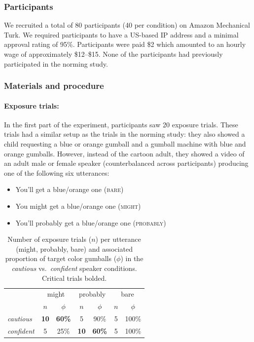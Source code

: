 \documentclass[lucida,biblatex]{sp} %
\begin{document}
\subsubsection{Participants}
We recruited a total of 80 participants (40 per condition) on Amazon Mechanical Turk. 
We required participants to have a US-based IP address and a minimal approval rating 
of 95\%. Participants were paid \$2 which amounted to an hourly wage of approximately 
\$12--\$15. None of the participants had previously participated in the norming study.

\subsubsection{Materials and procedure}

\paragraph{Exposure trials:} In the first part of the experiment, participants saw 20 exposure trials. 
These trials had a similar setup as the trials in the norming study: 
they also showed a child requesting a blue or orange gumball and a gumball machine with blue and orange gumballs. 
However, instead of the cartoon adult, they showed a video of an adult male or female speaker (counterbalanced across participants) producing one of the following six utterances:

\begin{itemize}
\item You'll get a blue/orange one (\textsc{bare})
\item You might get a blue/orange one (\textsc{might})
\item You'll probably get a blue/orange one (\textsc{probably})
\end{itemize}

\begin{table}
\centering
\begin{tabular}{l c c c c c c}
\toprule
& \multicolumn{2}{c}{\sc might} & \multicolumn{2}{c}{\sc probably} & \multicolumn{2}{c}{\sc bare}\\
& $n$ & $\phi$ & $n$ & $\phi$ & $n$ & $\phi$\\
\midrule
\emph{cautious} & {\bf 10} & {\bf 60\%} & 5 & 90\% & 5 & 100\%\\
\emph{confident} & 5 & 25\% & {\bf 10}  & {\bf 60\%} & 5  & 100\%\\  
\bottomrule
\end{tabular}
\caption{Number of exposure trials ($n$) per utterance ({\sc might}, {\sc probably}, {\sc bare}) 
and associated proportion of target color gumballs ($\phi$) in the \emph{cautious} vs.~\emph{confident} 
speaker conditions. Critical trials bolded. \label{tbl:materials}}

\end{table}
\end{document}
